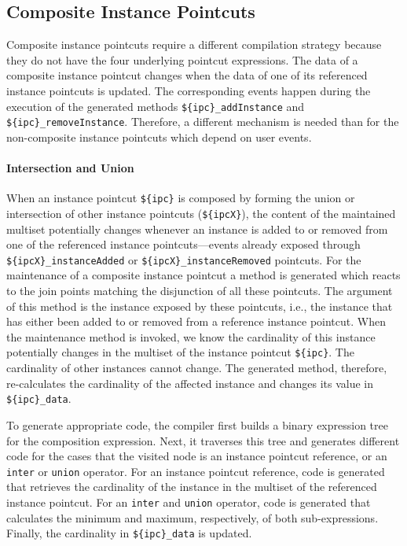 \subsection{Composite Instance Pointcuts}

Composite instance pointcuts require a different compilation strategy because they do not have the four underlying pointcut expressions.
The data of a composite instance pointcut changes when the data of one of its referenced instance pointcuts is updated.
The corresponding events happen during the execution of the generated methods \lstinline!${ipc}_addInstance! and \lstinline!${ipc}_removeInstance!.
Therefore, a different mechanism is needed than for the non-composite instance pointcuts which depend on user events.

\paragraph{Intersection and Union}

When an instance pointcut \lstinline!${ipc}! is composed by forming the union or intersection of other instance pointcuts (\lstinline!${ipcX}!), the content of the maintained multiset potentially changes whenever an instance is added to or removed from one of the referenced instance pointcuts---events already exposed through \lstinline!${ipcX}_instanceAdded! or \newline\lstinline!${ipcX}_instanceRemoved! pointcuts.
For the maintenance of a composite instance pointcut a method is generated which reacts to the join points matching the disjunction of all these pointcuts.
The argument of this method is the instance exposed by these pointcuts, i.e., the instance that has either been added to or removed from a reference instance pointcut.
When the maintenance method is invoked, we know the cardinality of this instance potentially changes in the multiset of the instance pointcut \lstinline!${ipc}!.
The cardinality of other instances cannot change.
The generated method, therefore, re-calculates the cardinality of the affected instance and changes its value in \lstinline!${ipc}_data!.

To generate appropriate code, the compiler first builds a binary expression tree for the composition expression.
Next, it traverses this tree and generates different code for the cases that the visited node is an instance pointcut reference, or an \texttt{inter} or \texttt{union} operator.
For an instance pointcut reference, code is generated that retrieves the cardinality of the instance in the multiset of the referenced instance pointcut.
For an \texttt{inter} and \texttt{union} operator, code is generated that calculates the minimum and maximum, respectively, of both sub-expressions. Finally, the cardinality in \lstinline!${ipc}_data! is updated.

